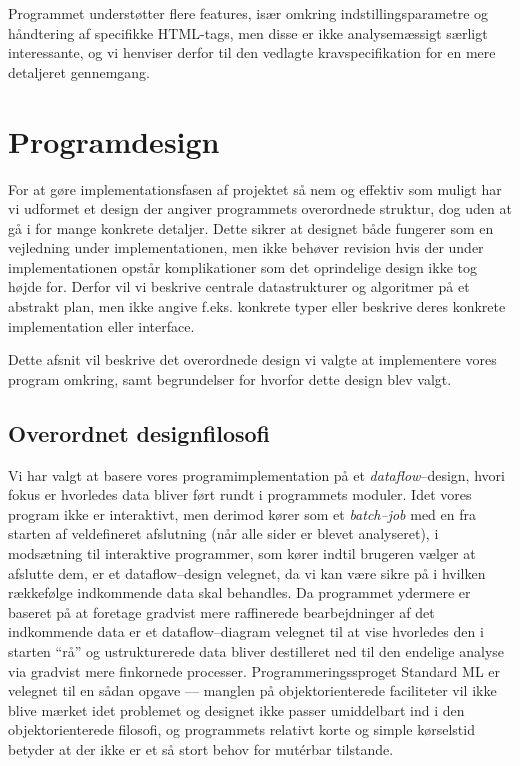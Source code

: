 \documentclass[a4paper,oneside,article]{memoir}
\begin{document}
Programmet understøtter flere features, især omkring
indstillingsparametre og håndtering af specifikke HTML-tags, men disse
er ikke analysemæssigt særligt interessante, og vi henviser derfor til
den vedlagte kravspecifikation for en mere detaljeret gennemgang.

\newpage
\chapter{Programdesign}

For at gøre implementationsfasen af projektet så nem og effektiv som
muligt har vi udformet et design der angiver programmets overordnede
struktur, dog uden at gå i for mange konkrete detaljer. Dette sikrer
at designet både fungerer som en vejledning under implementationen,
men ikke behøver revision hvis der under implementationen opstår
komplikationer som det oprindelige design ikke tog højde for. Derfor
vil vi beskrive centrale datastrukturer og algoritmer på et abstrakt
plan, men ikke angive f.eks. konkrete typer eller beskrive deres
konkrete implementation eller interface.

Dette afsnit vil beskrive det overordnede design vi valgte at
implementere vores program omkring, samt begrundelser for hvorfor
dette design blev valgt.

\section{Overordnet designfilosofi}
Vi har valgt at basere vores programimplementation på et
\textit{dataflow}--design, hvori fokus er hvorledes data bliver ført
rundt i programmets moduler. Idet vores program ikke er interaktivt,
men derimod kører som et \textit{batch--job} med en fra starten af
veldefineret afslutning (når alle sider er blevet analyseret), i
modsætning til interaktive programmer, som kører indtil brugeren
vælger at afslutte dem, er et dataflow--design velegnet, da vi kan
være sikre på i hvilken rækkefølge indkommende data skal behandles. Da
programmet ydermere er baseret på at foretage gradvist mere
raffinerede bearbejdninger af det indkommende data er et
dataflow--diagram velegnet til at vise hvorledes den i starten ``rå''
og ustrukturerede data bliver destilleret ned til den endelige analyse
via gradvist mere finkornede processer. Programmeringssproget Standard
ML er velegnet til en sådan opgave --- manglen på objektorienterede
faciliteter vil ikke blive mærket idet problemet og designet ikke
passer umiddelbart ind i den objektorienterede filosofi, og
programmets relativt korte og simple kørselstid betyder at der ikke er
et så stort behov for mutérbar tilstande. 
\end{document}
